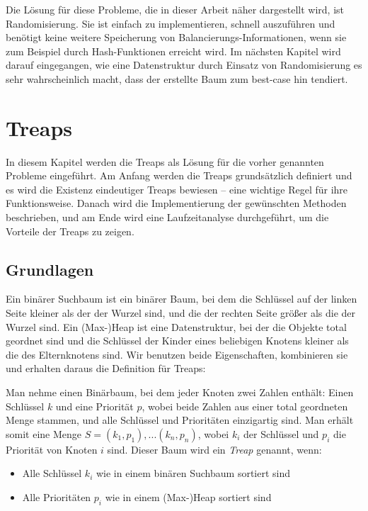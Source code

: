 \documentclass[a4paper]{scrreprt}
\theoremstyle{definition}
\begin{document}
Die Lösung für diese Probleme, die in dieser Arbeit näher dargestellt wird, ist Randomisierung.
Sie ist einfach zu implementieren, schnell auszuführen und benötigt keine weitere Speicherung von Balancierungs-Informationen, wenn sie zum Beispiel durch Hash-Funktionen erreicht wird.
Im nächsten Kapitel wird darauf eingegangen, wie eine Datenstruktur durch Einsatz von Randomisierung es sehr wahrscheinlich macht, dass der erstellte Baum zum best-case hin tendiert.


\chapter{Treaps}
\label{sec:treaps}

In diesem Kapitel werden die Treaps als Lösung für die vorher genannten Probleme eingeführt.
Am Anfang werden die Treaps grundsätzlich definiert und es wird die Existenz eindeutiger Treaps bewiesen -- eine wichtige Regel für ihre Funktionsweise.
Danach wird die Implementierung der gewünschten Methoden beschrieben, und am Ende wird eine Laufzeitanalyse durchgeführt, um die Vorteile der Treaps zu zeigen.

\section{Grundlagen}
\label{sec:treapsbasics}

Ein binärer Suchbaum ist ein binärer Baum, bei dem die Schlüssel auf der linken Seite kleiner als der der Wurzel sind, und die der rechten Seite größer als die der Wurzel sind.
Ein (Max-)Heap ist eine Datenstruktur, bei der die Objekte total geordnet sind und die Schlüssel der Kinder eines beliebigen Knotens kleiner als die des Elternknotens sind.
Wir benutzen beide Eigenschaften, kombinieren sie und erhalten daraus die Definition für Treaps:

Man nehme einen Binärbaum, bei dem jeder Knoten zwei Zahlen enthält: Einen Schlüssel $k$ und eine Priorität $p$, wobei beide Zahlen aus einer total geordneten Menge stammen, und alle Schlüssel und Prioritäten einzigartig sind. Man erhält somit eine Menge $S = {(k_1, p_1), ... (k_n, p_n)}$, wobei $k_i$ der Schlüssel und $p_i$ die Priorität von Knoten $i$ sind. Dieser Baum wird ein \emph{Treap} genannt, wenn:

\begin{itemize}
\item Alle Schlüssel $k_i$ wie in einem binären Suchbaum sortiert sind
\item Alle Prioritäten $p_i$ wie in einem (Max-)Heap sortiert sind
\end{itemize}
\end{document}
